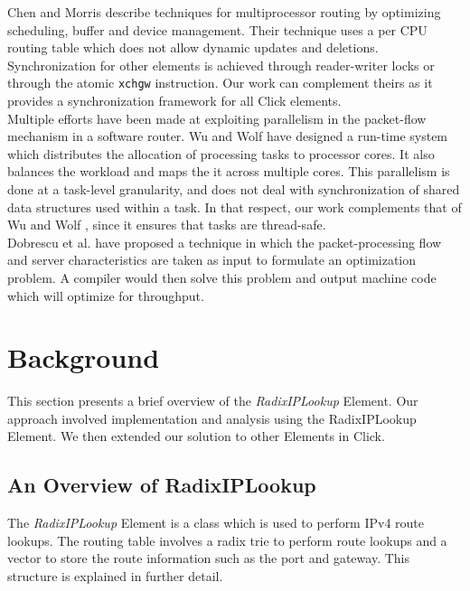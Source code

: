\documentclass[a4paper]{article}
\begin{document}
Chen and Morris \cite{chenmorris} describe techniques for multiprocessor routing by optimizing scheduling, buffer and device management. Their technique uses a per CPU routing table which does not allow dynamic updates and deletions. Synchronization for other elements is achieved through reader-writer locks or through the atomic \texttt{xchgw} instruction. Our work can complement theirs as it provides a synchronization framework for all Click elements.\\

Multiple efforts have been made at exploiting parallelism in the packet-flow mechanism in a software router. Wu and Wolf \cite{runtimepacketprocessing} have designed a run-time system which distributes the allocation of processing tasks to processor cores. It also balances the workload and maps the it across multiple cores. This parallelism is done at a task-level granularity, and does not deal with synchronization of shared data structures used within a task. In that respect, our work complements that of Wu and Wolf \cite{runtimepacketprocessing}, since it ensures that tasks are thread-safe.\\ 


Dobrescu et al. \cite{dobrescu} have proposed a technique in which the packet-processing flow and server characteristics are taken as input to formulate an optimization problem. A compiler would then solve this problem and output machine code which will optimize for throughput.
\section{Background}
\label{sec:background}
This section presents a brief overview of the \emph{RadixIPLookup} Element. Our approach involved implementation and analysis using the RadixIPLookup Element. We then extended our solution to other Elements in Click. 
\subsection{An Overview of RadixIPLookup}
The \emph{RadixIPLookup} Element \cite{radixiplookup} is a class which is used to perform IPv4 route lookups. The routing table involves a radix trie to perform route lookups and a vector to store the route information such as the port and gateway. This structure is explained in further detail. 
\end{document}
